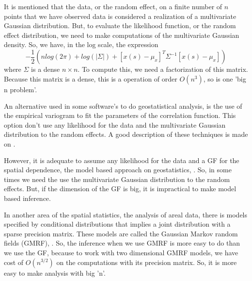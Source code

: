 It is mentioned that the data, or the random effect,  
on a finite number of $n$ points that we have observed 
data is considered a realization of a 
multivariate Gaussian distribution. 
But, to evaluate the likelihood function, or the random 
effect distribution, we need to make 
computations of the multivariate Gaussian density. 
So, we have, in the log scale, the expression 
\begin{equation}
-\frac{1}{2}\left(nlog(2\pi) + log(|\Sigma|) 
+ [x(s) - \mu_x]^{T}\Sigma^{-1}[x(s)-\mu_x]\right)
\end{equation}
where $\Sigma$ is a dense $n\times n$. 
To compute this, we need a factorization of this matrix. 
Because this matrix is a dense, this is a operation of 
order $O(n^3)$, so is one 'big n problem'. 

An alternative used in some software's to do 
geostatistical analysis, is the use of the empirical 
variogram to fit the parameters of the correlation 
function. This option don't use any likelihood for 
the data and the multivariate Gaussian 
distribution to the random effects. 
A good description of these techniques is made 
on \cite{cressie:1993}. 

However, it is adequate to assume any likelihood for the 
data and a GF for the spatial dependence, the model 
based approach on geostatistics, \cite{diggleribeiro:2007}. 
So, in some times we need the use the multivariate 
Gaussian distribution to the random effects. 
But, if the dimension of the GF is big, 
it is impractical to make model based inference. 

In another area of the spatial statistics, the 
analysis of areal data, there is models specified 
by conditional distributions that implies a joint 
distribution with a sparse precision matrix. 
These models are called the 
Gaussian Markov random fields (GMRF), 
\cite{RueHeld:2005}. 
So, the inference when we use GMRF is more easy 
to do than we use the GF, because to work with two dimensional 
GMRF models, we have cost of $O(n^{3/2})$ 
on the computations with its precision matrix. 
So, it is more easy to make analysis with big 'n'. 
